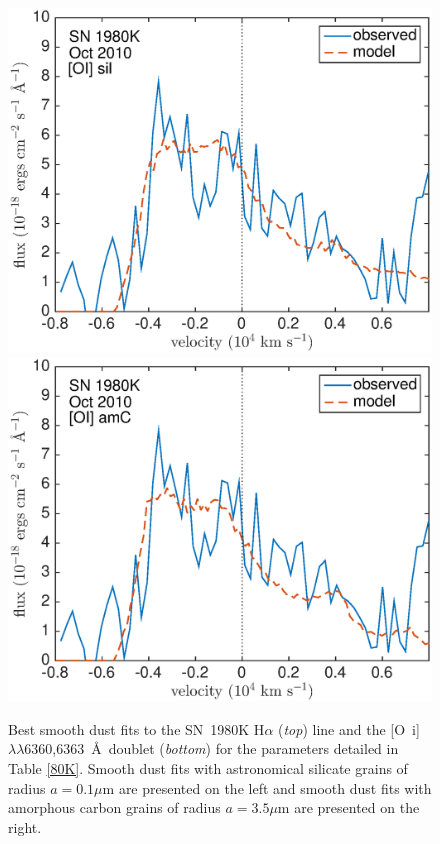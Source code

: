 \begin{figure}[!t]
\includegraphics[scale=0.4,clip=true, trim=20 0 40 20]{chapters/chapter6/figs/80K/smooth/OI}
\includegraphics[scale=0.4,clip=true, trim=20 0 40 20]{chapters/chapter6/figs/80K/smooth/OI_amC}
\caption{Best smooth dust fits to the SN~1980K H$\alpha$ ({\em top}) line and the  [O~{\sc i}]$\lambda\lambda$6360,6363~\AA\ doublet ({\em bottom}) for the parameters detailed in Table \ref{80K}.  Smooth dust fits with astronomical silicate grains of radius $a=0.1 \mu$m are presented on the left and smooth dust fits with amorphous carbon grains of radius $a=3.5 \mu$m are presented on the right.}
\label{80K_smooth}
\end{figure}


